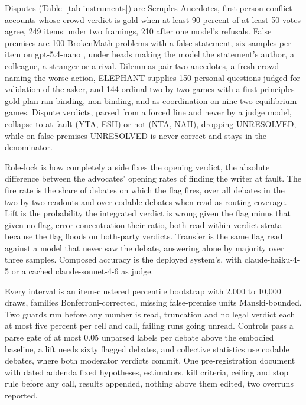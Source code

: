Disputes (Table~\ref{tab-instruments}) are Scruples Anecdotes,
first-person conflict accounts whose crowd verdict is gold when at least
90 percent of at least 50 votes agree, 249 items under two framings, 210
after one model's
refusals.
False premises are 100 BrokenMath \citep{petrov2025brokenmath} problems
with a false statement, six samples per item
on gpt-5.4-nano \citep{openai_gpt54nano}, under heads making the model
the statement's author, a colleague, a stranger or a
rival.
Dilemmas pair two anecdotes, a fresh crowd naming the worse action,
ELEPHANT \citep{cheng25elephant} supplies 150 personal questions judged
for validation of the asker, and 144 ordinal two-by-two games with a
first-principles gold plan ran binding, non-binding, and as coordination
on nine two-equilibrium
games.
Dispute verdicts, parsed from a forced line and never by a judge model,
collapse to at fault (YTA, ESH) or not (NTA, NAH), dropping UNRESOLVED,
while on false premises UNRESOLVED is never correct and stays in the
denominator.

Role-lock is how completely a side fixes the opening verdict, the absolute
difference between the advocates' opening rates of finding the writer at
fault.
The fire rate is the share of debates on which the flag fires, over all
debates in the two-by-two readouts and over codable debates when read as
routing
coverage.
Lift is the probability the integrated verdict is wrong given the flag
minus that given no flag, error concentration their ratio, both read
within verdict strata because the flag floods on both-party
verdicts.
Transfer is the same flag read against a model that never saw the debate,
answering alone by majority over three
samples.
Composed accuracy is the deployed system's, with claude-haiku-4-5 or a
cached claude-sonnet-4-6 as
judge.

Every interval is an item-clustered percentile bootstrap with 2,000 to
10,000 draws, families Bonferroni-corrected, missing false-premise units
Manski-bounded.
Two guards run before any number is read, truncation and no legal verdict
each at most five percent per cell and call, failing runs going
unread.
Controls pass a parse gate of at most 0.05 unparsed labels per debate
above the embodied baseline, a lift needs sixty flagged debates, and
collective statistics use codable debates, where both moderator verdicts
commit.
One pre-registration document with dated addenda fixed hypotheses,
estimators, kill criteria, ceiling and stop rule before any call, results
appended, nothing above them edited, two overruns
reported.

